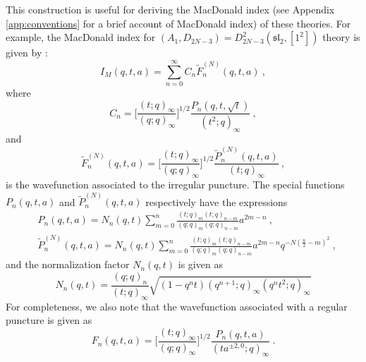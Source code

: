 \documentclass[a4paper,10pt]{article}
\newcommand{\mf}[1]{\mathfrak{#1}}
\begin{document}
This construction is useful for deriving the MacDonald index (see Appendix \ref{app:conventions} for a brief account of MacDonald index) of these theories. For example, the MacDonald index for $(A_1,D_{2N-3})=D_{2N-3}^2(\mf{sl}_2,[1^2])$ theory is given by \cite{Buican:2015tda}:
\begin{equation}\label{eq:Mac_class_S-1}
    I_M(q,t,a)=\sum_{n=0}^{\infty}C_n\tilde{F}_n^{(N)}(q,t,a)~,
\end{equation}
where
\begin{equation}
    C_n=\bigg[\frac{(t;q)_{\infty}}{(q;q)_{\infty}} \bigg]^{1/2}\frac{P_n(q,t,\sqrt{t})}{(t^2;q)_{\infty}}~,
\end{equation}
and
\begin{equation}
    \tilde{F}_n^{(N)}(q,t,a)=\bigg[\frac{(t;q)_{\infty}}{(q;q)_{\infty}} \bigg]^{1/2}\frac{\tilde{P}_n^{(N)}(q,t,a)}{(t;q)_{\infty}}~,
\end{equation}
is the wavefunction associated to the irregular puncture. The special functions $P_n(q,t,a)$ and $\tilde{P}_n^{(N)}(q,t,a)$ respectively have the expressions
\begin{equation}
    \begin{split}
        &P_n(q,t,a)=N_n(q,t)\sum_{m=0}^{n}\frac{(t;q)_m(t;q)_{n-m}}{(q;q)_m(q;q)_{n-m}}a^{2m-n}~, \\
        &\tilde{P}_n^{(N)}(q,t,a)=N_n(q,t)\sum_{m=0}^n\frac{(t;q)_m(t;q)_{n-m}}{(q;q)_m(q;q)_{n-m}}a^{2m-n}q^{-N(\frac{n}{2}-m)^2}~,
    \end{split}
\end{equation}
and the normalization factor $N_n(q,t)$ is given as
\begin{equation}\label{eq:Mac_class_S-7}
    N_n(q,t)=\frac{(q;q)_n}{(t;q)_{\infty}}\sqrt{(1-q^nt)(q^{n+1};q)_{\infty}(q^nt^2;q)_{\infty}}
\end{equation}
For completeness, we also note that the wavefunction associated with a regular puncture is given as
\begin{equation}
    F_n(q,t,a)=\bigg[\frac{(t;q)_{\infty}}{(q;q)_{\infty}} \bigg]^{1/2}\frac{P_n(q,t,a)}{(ta^{\pm 2,0};q)_{\infty}}~.
\end{equation}
\end{document}
